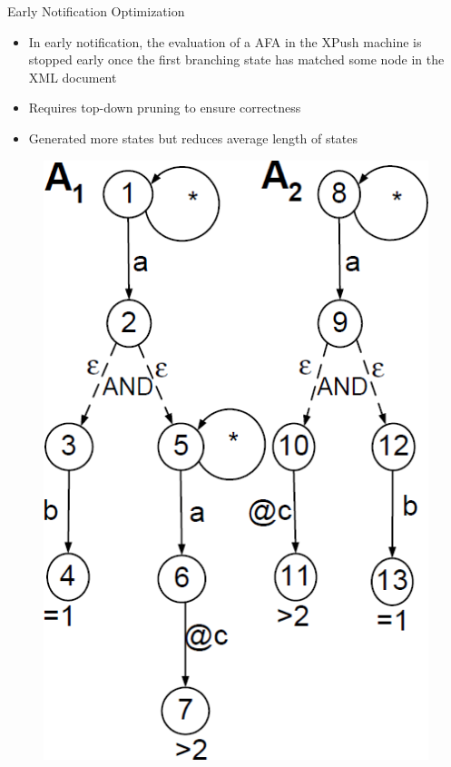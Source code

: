\documentclass[mathserif,serif]{beamer}
\begin{document}
  \begin{frame}{Early Notification Optimization}
    \begin{minipage}{0.63\textwidth}
      \begin{itemize}
        \item In early notification, the evaluation of a AFA in the XPush machine is stopped early once the first branching state has matched some node in the XML document
        \item Requires top-down pruning to ensure correctness
        \item Generated more states but reduces average length of states
      \end{itemize}
    \end{minipage}\quad
    \begin{minipage}{0.3\textwidth}
      \begin{figure}
        \centering
        \includegraphics[width=\textwidth]{AFA.png}
      \end{figure}
    \end{minipage}

  \end{frame}
\end{document}
